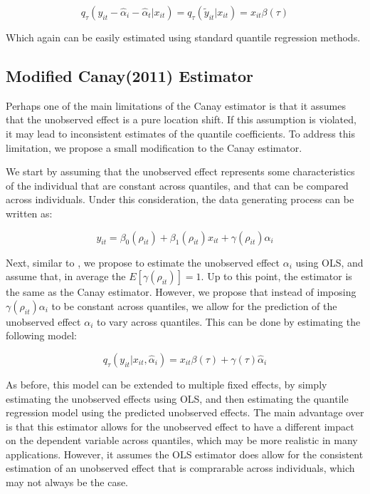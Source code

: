 \documentclass[bib]{statapress}
\begin{document}
\[q_{\tau}(y_{it}-\hat \alpha_i - \hat \alpha_t|x_{it})=q_{\tau}(\tilde y_{it}|x_{it}) = x_{it}\beta(\tau)
\]

Which again can be easily estimated using standard quantile regression
methods.

\subsection{Modified Canay(2011) Estimator}\label{sec-mcanay}

Perhaps one of the main limitations of the Canay estimator is that it
assumes that the unobserved effect is a pure location shift. If this
assumption is violated, it may lead to inconsistent estimates of the
quantile coefficients. To address this limitation, we propose a small
modification to the Canay estimator.

We start by assuming that the unobserved effect represents some
characteristics of the individual that are constant across quantiles,
and that can be compared across individuals. Under this consideration,
the data generating process can be written as:

\[y_{it} =\beta_0(\rho_{it}) +  \beta_1(\rho_{it}) x_{it} + \gamma(\rho_{it}) \alpha_i
\]

Next, similar to \citet{canay2011}, we propose to estimate the
unobserved effect \(\alpha_i\) using OLS, and assume that, in average
the \(E[\gamma(\rho_{it})]=1\). Up to this point, the estimator is the
same as the Canay estimator. However, we propose that instead of
imposing \(\gamma(\rho_{it}) \alpha_i\) to be constant across quantiles,
we allow for the prediction of the unobserved effect \(\alpha_i\) to
vary across quantiles. This can be done by estimating the following
model:

\[q_{\tau}(y_{it}|x_{it},\hat \alpha_i) =  x_{it}\beta(\tau)+\gamma(\tau) \hat\alpha_i
\]

As before, this model can be extended to multiple fixed effects, by
simply estimating the unobserved effects using OLS, and then estimating
the quantile regression model using the predicted unobserved effects.
The main advantage over \citet{canay2011} is that this estimator allows
for the unobserved effect to have a different impact on the dependent
variable across quantiles, which may be more realistic in many
applications. However, it assumes the OLS estimator does allow for the
consistent estimation of an unobserved effect that is comprarable across
individuals, which may not always be the case.
\end{document}
